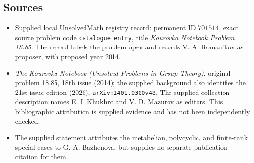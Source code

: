 \documentclass[11pt]{article}
\begin{document}
\subsection{Sources}
\begin{itemize}
\item Supplied local UnsolvedMath registry record: permanent ID \(701514\), exact source problem code \texttt{catalogue entry}, title \emph{Kourovka Notebook Problem 18.85}. The record labels the problem open and records V. A. Roman'kov as proposer, with proposed year 2014.
\item \emph{The Kourovka Notebook (Unsolved Problems in Group Theory)}, original problem 18.85, 18th issue (2014); the supplied background also identifies the 21st issue edition (2026), \texttt{arXiv:1401.0300v48}. The supplied collection description names E. I. Khukhro and V. D. Mazurov as editors. This bibliographic attribution is supplied evidence and has not been independently checked.
\item The supplied statement attributes the metabelian, polycyclic, and finite-rank special cases to G. A. Bazhenova, but supplies no separate publication citation for them.
\end{itemize}
\end{document}
